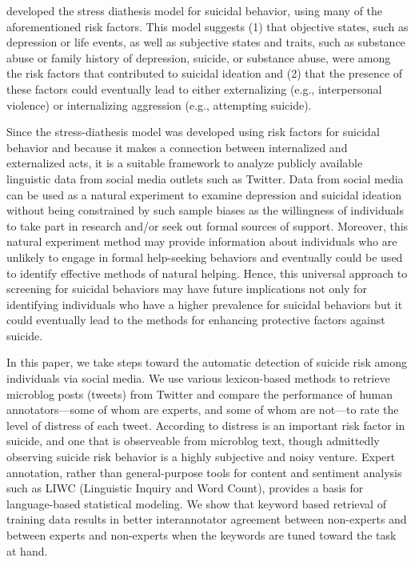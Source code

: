\documentclass[11pt]{article}
\begin{document}
 developed the stress diathesis model for suicidal behavior, using many of the aforementioned risk factors.  This model suggests (1) that objective states, such as depression or life events, as well as subjective states and traits, such as substance abuse or family history of depression, suicide, or substance abuse, were among the risk factors that contributed to suicidal ideation and (2) that the presence of these factors could eventually lead to either externalizing (e.g., interpersonal violence) or internalizing aggression (e.g., attempting suicide).

	Since the stress-diathesis model was developed using risk factors for suicidal behavior and because it makes a connection between internalized and externalized acts, it is a suitable framework to analyze publicly available linguistic data from social media outlets such as Twitter. Data from social media can be used as a natural experiment to examine depression and suicidal ideation without being constrained by such sample biases as the willingness of individuals to take part in research and/or seek out formal sources of support. Moreover, this natural experiment method may provide information about individuals who are unlikely to engage in formal help-seeking behaviors and eventually could be used to identify effective methods of natural helping. Hence, this universal approach to screening for suicidal behaviors may have future implications not only for identifying individuals who have a higher prevalence for suicidal behaviors but it could eventually lead to the methods for enhancing protective factors against suicide.  

In this paper, we take steps toward the automatic detection of suicide risk among individuals via social media. We use various lexicon-based methods to retrieve microblog posts (tweets) from Twitter and compare the performance of human annotators---some of
whom are experts, and some of whom are not---to rate the level of distress of each tweet. According to  distress is an important risk factor in suicide, and one that is observeable from microblog text, though admittedly observing suicide risk behavior is a highly subjective and noisy venture.  Expert annotation, rather than general-purpose tools for content and sentiment analysis such as LIWC (Linguistic Inquiry and Word Count), provides a basis for language-based statistical modeling.
We show that keyword based retrieval of training data results in better interannotator agreement between non-experts and between experts and non-experts when the keywords are tuned toward the task at hand.
\end{document}
